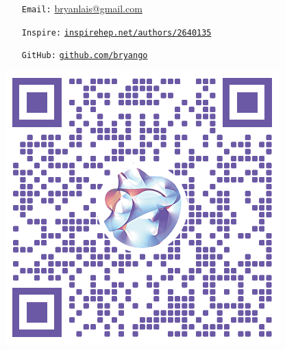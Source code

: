 \documentclass[10pt]{article}
\begin{document}
\begin{multicols}{3}
\hspace{-.7em}
\begin{minipage}[c]{.81\linewidth}
\begin{itemize}[noitemsep,leftmargin=5em]\small
\item[\texttt{Email:}]
	\url{bryanlais@gmail.com}
\item[\texttt{Inspire:}]
	\href{https://inspirehep.net/authors/2640135}{
		\texttt{inspirehep.net/authors/2640135}
	}
\item[\texttt{GitHub:}]
	\href{https://github.com/bryango}{
		\texttt{github.com/bryango}
	}
\end{itemize}
\end{minipage}%
\hfill%
\begin{minipage}{.17\linewidth}
\includegraphics[width=\linewidth]{img/inspire-qr-cy.png}
\end{minipage}%
~\mbox{}

\end{multicols}
\end{document}
